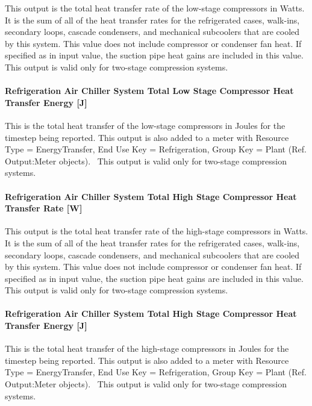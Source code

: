 This output is the total heat transfer rate of the low-stage compressors in Watts. It is the sum of all of the heat transfer rates for the refrigerated cases, walk-ins, secondary loops, cascade condensers, and mechanical subcoolers that are cooled by this system. This value does not include compressor or condenser fan heat. If specified as in input value, the suction pipe heat gains are included in this value.~ This output is valid only for two-stage compression systems.

\paragraph{Refrigeration Air Chiller System Total Low Stage Compressor Heat Transfer Energy {[}J{]}}\label{refrigeration-air-chiller-system-total-low-stage-compressor-heat-transfer-energy-j}

This is the total heat transfer of the low-stage compressors in Joules for the timestep being reported. This output is also added to a meter with Resource Type = EnergyTransfer, End Use Key = Refrigeration, Group Key = Plant (Ref. Output:Meter objects).~ This output is valid only for two-stage compression systems.

\paragraph{Refrigeration Air Chiller System Total High Stage Compressor Heat Transfer Rate {[}W{]}}\label{refrigeration-air-chiller-system-total-high-stage-compressor-heat-transfer-rate-w}

This output is the total heat transfer rate of the high-stage compressors in Watts. It is the sum of all of the heat transfer rates for the refrigerated cases, walk-ins, secondary loops, cascade condensers, and mechanical subcoolers that are cooled by this system. This value does not include compressor or condenser fan heat. If specified as in input value, the suction pipe heat gains are included in this value.~ This output is valid only for two-stage compression systems.

\paragraph{Refrigeration Air Chiller System Total High Stage Compressor Heat Transfer Energy {[}J{]}}\label{refrigeration-air-chiller-system-total-high-stage-compressor-heat-transfer-energy-j}

This is the total heat transfer of the high-stage compressors in Joules for the timestep being reported. This output is also added to a meter with Resource Type = EnergyTransfer, End Use Key = Refrigeration, Group Key = Plant (Ref. Output:Meter objects).~ This output is valid only for two-stage compression systems.

